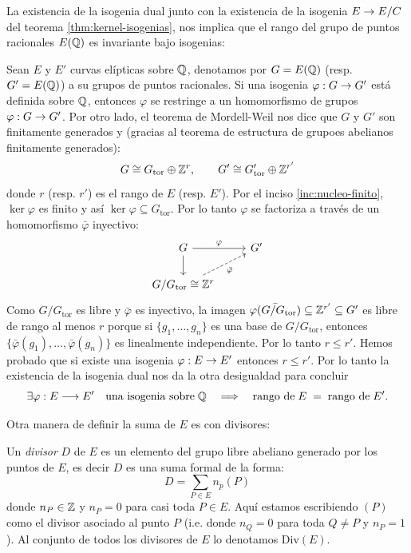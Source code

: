 \begin{nota}
	La existencia de la isogenia dual	junto con la existencia de la isogenia $E\rightarrow E/C$ del teorema \ref{thm:kernel-isogenias}, nos implica que el rango del grupo de puntos racionales $E(\mathbb{Q})$ es invariante bajo isogenias:
	
	Sean $E$ y $E'$ curvas elípticas sobre $\mathbb{Q}$, denotamos por $G=E(\mathbb{Q})$ (resp. $G'=E(\mathbb{Q})$) a su grupos de puntos racionales. Si una isogenia $\varphi:G\rightarrow G'$ está definida sobre $\mathbb{Q}$, entonces $\varphi$ se restringe a un homomorfismo de grupos $\varphi:G\rightarrow G'$. Por otro lado, el teorema de Mordell-Weil nos dice que $G$ y $G'$ son finitamente generados y (gracias al teorema de estructura de grupoes abelianos finitamente generados):
\[
	G\cong G_\mathrm{tor}\oplus\mathbb{Z}^r,\qquad G'\cong G'_\mathrm{tor}\oplus\mathbb{Z}^{r'}
\]
donde $r$ (resp. $r'$) es el rango de $E$ (resp. $E'$). Por el inciso \ref{inc:nucleo-finito}, $\ker\varphi$ es finito y así $\ker\varphi\subseteq G_\mathrm{tor}$. Por lo tanto $\varphi$ se factoriza a través de un homomorfismo $\bar{\varphi}$ inyectivo:
\[
	\begin{tikzcd}
		G \arrow[d] \arrow[r,"\varphi"] & G' \\
		G/G_\mathrm{tor}\cong\ZZ^r \arrow[ur,dashed,"\bar{\varphi}"']
	\end{tikzcd}
\]
Como $G/G_\mathrm{tor}$ es libre y $\bar{\varphi}$ es inyectivo, la imagen $\bar{\varphi(G/G_\mathrm{tor})}\subseteq\mathbb{Z}^{r'}\subseteq G'$ es libre de rango al menos $r$ porque si $\{g_1,\ldots,g_n\}$ es una base de $G/G_\mathrm{tor}$, entonces $\{\bar{\varphi}(g_1),\ldots,\bar{\varphi}(g_n)\}$ es linealmente independiente. Por lo tanto $r\leq r'$. Hemos probado que si existe una isogenia $\varphi:E\rightarrow E'$ entonces $r\leq r'$.  Por lo tanto la existencia de la isogenia dual nos da la otra desigualdad para concluir
\[
	\exists \varphi: E\longrightarrow E' \quad\text{una isogenia sobre}\;\mathbb{Q}\quad\Longrightarrow\quad
	\text{rango de}\; E \;= \;\text{rango de}\; E'.
\]
\end{nota}

Otra manera de definir la suma de $E$ es con divisores:

\begin{defin}
  Un \emph{divisor} $D$ de $E$ es un elemento del grupo libre abeliano generado por los puntos de
  $E$, es decir $D$ es una suma formal de la forma:
  \[
    D=\sum_{P\in E}n_p(P)
  \]
  donde $n_P\in\mathbb{Z}$ y $n_P=0$ para casi toda $P\in E$. Aqu\'i estamos escribiendo $(P)$ como el divisor
  asociado al punto $P$ (i.e. donde $n_Q=0$ para toda $Q\neq P$ y $n_P=1$). Al conjunto de todos los
  divisores de $E$ lo denotamos Div$(E)$.
\end{defin}

